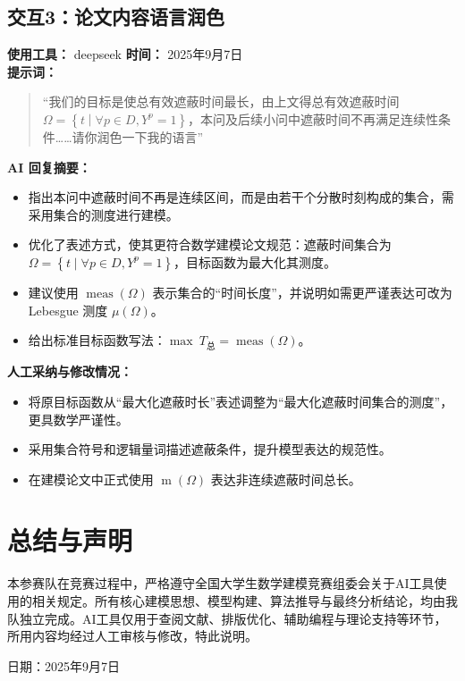 \documentclass[12pt,a4paper]{article}
\begin{document}
\subsection*{交互3：论文内容语言润色}
\textbf{使用工具：} deepseek \quad \textbf{时间：} 2025年9月7日 \\
\textbf{提示词：}
\begin{quote}
“我们的目标是使总有效遮蔽时间最长，由上文得总有效遮蔽时间 $\Omega = \left\{ t \middle| \forall p \in D, Y^p = 1 \right\}$，本问及后续小问中遮蔽时间不再满足连续性条件……请你润色一下我的语言”
\end{quote}

\textbf{AI 回复摘要：}
\begin{itemize}
    \item 指出本问中遮蔽时间不再是连续区间，而是由若干个分散时刻构成的集合，需采用集合的测度进行建模。
    \item 优化了表述方式，使其更符合数学建模论文规范：遮蔽时间集合为 $\Omega = \left\{ t \mid \forall p \in D, Y^p = 1 \right\}$，目标函数为最大化其测度。
    \item 建议使用 $\operatorname{meas}(\Omega)$ 表示集合的“时间长度”，并说明如需更严谨表达可改为 Lebesgue 测度 $\mu(\Omega)$。
    \item 给出标准目标函数写法：$\max\ T_{\text{总}} = \operatorname{meas}(\Omega)$。
\end{itemize}

\textbf{人工采纳与修改情况：}
\begin{itemize}
    \item 将原目标函数从“最大化遮蔽时长”表述调整为“最大化遮蔽时间集合的测度”，更具数学严谨性。
    \item 采用集合符号和逻辑量词描述遮蔽条件，提升模型表达的规范性。
    \item 在建模论文中正式使用 $\operatorname{m}(\Omega)$ 表达非连续遮蔽时间总长。
\end{itemize}


\vspace{1em}
\section{总结与声明}

\noindent
本参赛队在竞赛过程中，严格遵守全国大学生数学建模竞赛组委会关于AI工具使用的相关规定。所有核心建模思想、模型构建、算法推导与最终分析结论，均由我队独立完成。AI工具仅用于查阅文献、排版优化、辅助编程与理论支持等环节，所用内容均经过人工审核与修改，特此说明。

\vspace{2em}
\noindent
\hfill 日期：2025年9月7日
\end{document}
